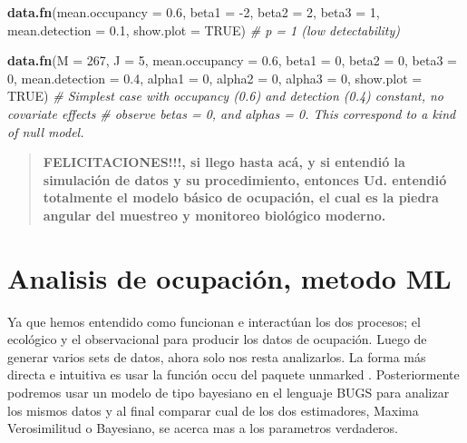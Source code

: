 \documentclass[]{book}
\newenvironment{Shaded}{\begin{snugshade}}{\end{snugshade}}
\newcommand{\KeywordTok}[1]{\textcolor[rgb]{0.13,0.29,0.53}{\textbf{{#1}}}}
\newcommand{\DataTypeTok}[1]{\textcolor[rgb]{0.13,0.29,0.53}{{#1}}}
\newcommand{\DecValTok}[1]{\textcolor[rgb]{0.00,0.00,0.81}{{#1}}}
\newcommand{\FloatTok}[1]{\textcolor[rgb]{0.00,0.00,0.81}{{#1}}}
\newcommand{\CommentTok}[1]{\textcolor[rgb]{0.56,0.35,0.01}{\textit{{#1}}}}
\newcommand{\OtherTok}[1]{\textcolor[rgb]{0.56,0.35,0.01}{{#1}}}
\newcommand{\NormalTok}[1]{{#1}}
\begin{document}
\begin{Shaded}
\begin{Highlighting}[]
\KeywordTok{data.fn}\NormalTok{(}\DataTypeTok{mean.occupancy =} \FloatTok{0.6}\NormalTok{, }\DataTypeTok{beta1 =} \NormalTok{-}\DecValTok{2}\NormalTok{, }\DataTypeTok{beta2 =} \DecValTok{2}\NormalTok{, }\DataTypeTok{beta3 =} \DecValTok{1}\NormalTok{, }
        \DataTypeTok{mean.detection =} \FloatTok{0.1}\NormalTok{, }\DataTypeTok{show.plot =} \OtherTok{TRUE}\NormalTok{)  }\CommentTok{# p = 1 (low detectability)}

\KeywordTok{data.fn}\NormalTok{(}\DataTypeTok{M =} \DecValTok{267}\NormalTok{, }\DataTypeTok{J =} \DecValTok{5}\NormalTok{, }\DataTypeTok{mean.occupancy =} \FloatTok{0.6}\NormalTok{, }\DataTypeTok{beta1 =} \DecValTok{0}\NormalTok{, }\DataTypeTok{beta2 =} \DecValTok{0}\NormalTok{, }\DataTypeTok{beta3 =} \DecValTok{0}\NormalTok{, }
        \DataTypeTok{mean.detection =} \FloatTok{0.4}\NormalTok{, }\DataTypeTok{alpha1 =} \DecValTok{0}\NormalTok{, }\DataTypeTok{alpha2 =} \DecValTok{0}\NormalTok{, }\DataTypeTok{alpha3 =} \DecValTok{0}\NormalTok{, }\DataTypeTok{show.plot =} \OtherTok{TRUE}\NormalTok{)}
\CommentTok{# Simplest case with occupancy (0.6) and detection (0.4) constant, no covariate effects}
\CommentTok{# observe betas = 0, and alphas = 0. This correspond to a kind of null model.}
\end{Highlighting}
\end{Shaded}

\begin{quote}
\textbf{FELICITACIONES!!!, si llego hasta acá, y si entendió la
simulación de datos y su procedimiento, entonces Ud. entendió totalmente
el modelo básico de ocupación, el cual es la piedra angular del muestreo
y monitoreo biológico moderno.}
\end{quote}

\chapter{Analisis de ocupación, metodo ML}\label{unmarked}

Ya que hemos entendido como funcionan e interactúan los dos procesos; el
ecológico y el observacional para producir los datos de ocupación. Luego
de generar varios sets de datos, ahora solo nos resta analizarlos. La
forma más directa e intuitiva es usar la función occu del paquete
unmarked \citep{Fiske2011}. Posteriormente podremos usar un modelo de
tipo bayesiano en el lenguaje BUGS para analizar los mismos datos y al
final comparar cual de los dos estimadores, Maxima Verosimilitud o
Bayesiano, se acerca mas a los parametros verdaderos.
\end{document}
